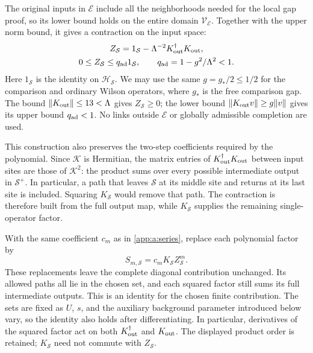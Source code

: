 \documentclass[11pt,a4paper]{article}
\theoremstyle{remark}
\begin{document}
The original inputs in $\mathcal E$ include all the neighborhoods
needed for the local gap proof, so its lower bound holds on the entire
domain $\mathcal V_{\mathcal E}$. Together with the upper norm
bound, it gives a contraction on the input space:
\begin{equation}
 \begin{gathered}
 Z_{\mathcal S}
   =1_{\mathcal S}-\Lambda^{-2}K_{\rm out}^{\dagger} K_{\rm out},\\
 0\le Z_{\mathcal S}\le q_{\rm ad}1_{\mathcal S},
 \qquad q_{\rm ad}=1-g^2/\Lambda^2<1.
 \end{gathered}
 \label{app:a:compression}
\end{equation}
Here $1_{\mathcal S}$ is the identity on
$\mathcal H_{\mathcal S}$. We may use the same
$g=g_*/2\le1/2$ for the comparison and ordinary Wilson operators,
where $g_*$ is the free comparison gap. The bound
$\|K_{\rm out}\|\le13<\Lambda$ gives $Z_{\mathcal S}\ge0$;
the lower bound $\|K_{\rm out}v\|\ge g\|v\|$ gives its upper
bound $q_{\rm ad}<1$. No links outside $\mathcal E$ or globally
admissible completion are used.

This construction also preserves the two-step coefficients required by
the polynomial. Since $\mathcal K$ is Hermitian, the matrix entries
of $K_{\rm out}^\dagger K_{\rm out}$ between input sites are
those of $\mathcal K^2$: the product sums over every possible
intermediate output in $\mathcal S^+$. In particular, a path that
leaves $\mathcal S$ at its middle site and returns at its last site
is included. Squaring $K_{\mathcal S}$ would remove that path.
The contraction is therefore built from the full output map, while
$K_{\mathcal S}$ supplies the remaining single-operator factor.

With the same coefficient $c_m$ as in \eqref{app:a:series}, replace
each polynomial factor by
\begin{equation}
 S_{m,\mathcal S}=c_mK_{\mathcal S}Z_{\mathcal S}^m.
\end{equation}
These replacements leave the complete diagonal contribution unchanged.
Its allowed paths all lie in the chosen set, and each squared factor
still sums its full intermediate outputs. This is an identity for the
chosen finite contribution.
The sets are fixed as $U$, $s$, and the auxiliary background parameter
introduced below vary, so the identity also holds after differentiating.
In particular, derivatives of the squared factor act on both
$K_{\rm out}^\dagger$ and $K_{\rm out}$. The displayed product
order is retained; $K_{\mathcal S}$ need not commute with
$Z_{\mathcal S}$.
\end{document}
